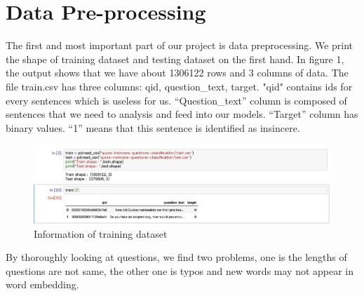 \documentclass{article}
\begin{document}
\section{ Data Pre-processing}
\noindent The first and most important part of our project is data preprocessing.  We print the shape of training dataset and testing dataset on the first hand. In figure 1, the output shows that we have about 1306122 rows and 3 columns of data. The file train.csv has three columns: qid, question\_text, target. "qid" contains ids for every sentences which is useless for us.  “Question\_text” column is composed of sentences that we need to analysis and feed into our models. “Target” column has binary values. “1” means that this sentence is identified as insincere. \\
\begin{figure}[H] %
 	\vspace{-0.8cm}
	\centering
	\includegraphics[scale = 0.3]{n1.jpeg}
	\caption{Information of training dataset
		}
\end{figure}
\noindent By thoroughly looking at questions, we find two problems, one is the lengths of questions are not same, the other one is typos and new words may not appear in word embedding.\\
\end{document}
